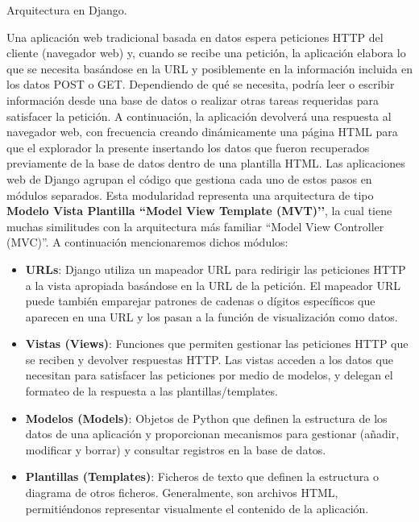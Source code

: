 \documentclass[12pt,a4paper]{article}
\makeatletter
\renewcommand\paragraph{\@startsection{paragraph}{4}{\z@}
            {-2.5ex\@plus -1ex \@minus -.25ex}
            {1.25ex \@plus .25ex}
            {\normalfont\normalsize\bfseries}}
\makeatother
\begin{document}
\begin{sloppypar}
\paragraph{Arquitectura en Django.}\label{arq_django}

Una aplicación web tradicional basada en datos espera peticiones HTTP del cliente (navegador web) y, cuando se recibe una petición, la aplicación elabora lo que se necesita basándose en la URL y posiblemente en la información incluida en los datos POST o GET. Dependiendo de qué se necesita, podría leer o escribir información desde una base de datos o realizar otras tareas requeridas para satisfacer la petición. A continuación, la aplicación devolverá una respuesta al navegador web, con frecuencia creando dinámicamente una página HTML para que el explorador la presente insertando los datos que fueron recuperados previamente de la base de datos dentro de una plantilla HTML.
Las aplicaciones web de Django agrupan el código que gestiona cada uno de estos pasos en módulos separados. Esta modularidad representa una arquitectura de tipo \textbf{Modelo Vista Plantilla ``Model View Template (MVT)’’}, la cual tiene muchas similitudes con la arquitectura más familiar ``Model View Controller (MVC)''. A continuación mencionaremos dichos módulos\cite{Mozila}:
\begin{itemize}
\item \textbf{URLs}: Django utiliza un mapeador URL para redirigir las peticiones HTTP a la vista apropiada basándose en la URL de la petición. El mapeador URL puede también emparejar patrones de cadenas o dígitos específicos que aparecen en una URL y los pasan a la función de visualización como datos. 
\item \textbf{Vistas (Views)}: Funciones que permiten gestionar las peticiones HTTP que se reciben y devolver respuestas HTTP. Las vistas acceden a los datos que necesitan para satisfacer las peticiones por medio de modelos, y delegan el formateo de la respuesta a las plantillas/templates.
\item \textbf{Modelos (Models)}: Objetos de Python que definen la estructura de los datos de una aplicación y proporcionan mecanismos para gestionar (añadir, modificar y borrar) y consultar registros en la base de datos. 
\item \textbf{Plantillas (Templates)}: Ficheros de texto que definen la estructura o diagrama de otros ficheros. Generalmente, son archivos HTML, permitiéndonos representar visualmente el contenido de la aplicación. 
\end{itemize}


\end{sloppypar}
\end{document}
